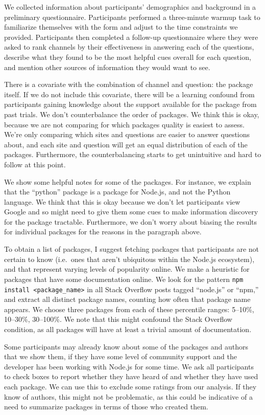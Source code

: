 We collected information about participants' demographics and background in a preliminary questionnaire.
Participants performed a three-minute warmup task to familiarize themselves with the form and adjust to the time constraints we provided.
Participants then completed a follow-up questionnaire where they were asked to rank channels by their effectiveness in answering each of the questions, describe what they found to be the most helpful cues overall for each question, and mention other sources of information they would want to see.
\fi

There is a covariate with the combination of channel and question: the package itself.
If we do not include this covariate, there will be a learning confound from participants gaining knowledge about the support available for the package from past trials.
We don't counterbalance the order of packages.
We think this is okay, because we are not comparing for which packages quality is easiest to assess.
We're only comparing which sites and questions are easier to answer questions about, and each site and question will get an equal distribution of each of the packages.
Furthermore, the counterbalancing starts to get unintuitive and hard to follow at this point.

We show some helpful notes for some of the packages.
For instance, we explain that the ``python'' package is a package for Node.js, and not the Python language.
We think that this is okay because we don't let participants view Google and so might need to give them some cues to make information discovery for the package tractable.
Furthermore, we don't worry about biasing the results for individual packages for the reasons in the paragraph above.
\fi

To obtain a list of packages, I suggest fetching packages that participants are not certain to know (i.e.\ ones that aren't ubiquitous within the Node.js ecosystem), and that represent varying levels of popularity online.
We make a heuristic for packages that have some documentation online.
We look for the pattern \texttt{npm install <package\_name>} in all Stack Overflow posts tagged ``node.js'' or ``npm,'' and extract all distinct package names, counting how often that package name appears.
We choose three packages from each of these percentile ranges: 5--10\%, 10--30\%, 30--100\%.
We note that this might confound the Stack Overflow condition, as all packages will have at least a trivial amount of documentation.

Some participants may already know about some of the packages and authors that we show them, if they have some level of community support and the developer has been working with Node.js for some time.
We ask all participants to check boxes to report whether they have heard of and whether they have used each package.
 We can use this to exclude some ratings from our analysis.
 If they know of authors, this might not be problematic, as this could be indicative of a need to summarize packages in terms of those who created them.
\fi
{}

